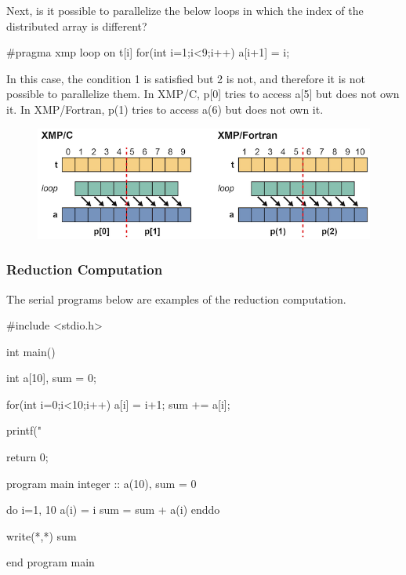Next, is it possible to parallelize the below loops in which the index
of the distributed array is different?

\begin{XCexample}
#pragma xmp loop on t[i]
  for(int i=1;i<9;i++)
    a[i+1] = i;
\end{XCexample}


In this case, the condition 1 is satisfied but 2 is not, and therefore
it is not possible to parallelize them. In XMP/C, p[0] tries to access
a[5] but does not own it. In XMP/Fortran, p(1) tries to access a(6) but
does not own it.

\begin{figure}
  \centering
  \includegraphics{figs/loop3.png}
\end{figure}


\subsubsection{Reduction Computation}

The serial programs below are examples of the reduction computation.

\begin{Cexample}
#include <stdio.h>

int main(){
  int a[10], sum = 0;

  for(int i=0;i<10;i++){
    a[i] = i+1;
    sum += a[i];
  }

  printf("%

  return 0;
}
\end{Cexample}

\begin{Fexample}
program main
  integer :: a(10), sum = 0

  do i=1, 10
    a(i) = i
    sum = sum + a(i)
  enddo

  write(*,*) sum

end program main
\end{Fexample}

